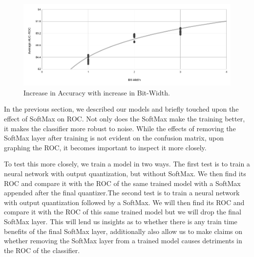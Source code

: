\begin{figure}[h]
    \centering
    \includegraphics[width=350pt]{figures/bison/BWvAcc.png}
    \caption{Increase in Accuracy with increase in Bit-Width.}
    \label{fig:BWvacc}
\end{figure}

In the previous section, we described our models and briefly touched upon the effect of SoftMax on ROC. Not only does the SoftMax make the training better, it makes the classifier more robust to noise. While the effects of removing the SoftMax layer after training is not evident on the confusion matrix, upon graphing the ROC, it becomes important to inspect it more closely.

To test this more closely, we train a model in two ways. The first test is to train a neural network with output quantization, but without SoftMax. We then find its ROC and compare it with the ROC of the same trained model with a SoftMax appended after the final quantizer.The second test is to train a neural network with output quantization followed by a SoftMax. We will then find its ROC and compare it with the ROC of this same trained model but we will drop the final SoftMax layer. This will lend us insights as to whether there is any train time benefits of the final SoftMax layer, additionally also allow us to make claims on whether removing the SoftMax layer from a trained model causes detriments in the ROC of the classifier. 

